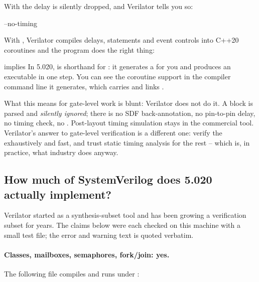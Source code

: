 With  the delay is silently dropped, and Verilator tells
you so:

\begin{txtcode}
                                --no-timing
\end{txtcode}

With , Verilator compiles delays,  statements and
event controls into C++20 coroutines and the program does the right thing:


\begin{notebox}{ implies }
In 5.020,  is shorthand for
: it generates a  for
you and produces an executable in one step. You can see the coroutine support
in the compiler command line it generates, which carries 
and links .
\end{notebox}

What this means for gate-level work is
blunt: Verilator does not do it. A  block is parsed and
\emph{silently ignored}; there is no SDF back-annotation, no pin-to-pin delay,
no timing check, no . Post-layout timing simulation stays in
the commercial tool. Verilator's answer to gate-level verification is a
different one: verify the \RTL{} exhaustively and fast, and trust static timing
analysis for the rest -- which is, in practice, what industry does anyway.

\subsection{How much of SystemVerilog does 5.020 actually implement?}
\label{sec:verilator:coverage}

Verilator started as a synthesis-subset tool and has been growing a
verification subset for years. The claims below were each checked on this
machine with a small test file; the error and warning text is quoted verbatim.

\paragraph{Classes, mailboxes, semaphores, fork/join: yes.} The following file
compiles and runs under :

